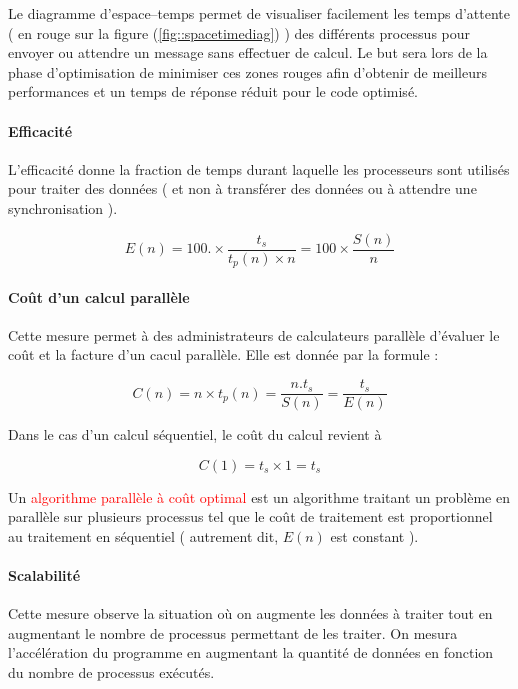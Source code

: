 \documentclass[fleqn,11pt]{article}
\begin{document}
Le diagramme d'espace--temps permet de visualiser facilement les temps d'attente ( en rouge sur la figure (\ref{fig::spacetimediag}) )
des différents processus pour envoyer ou attendre un message sans effectuer de calcul. Le but sera lors de la phase d'optimisation
de minimiser ces zones rouges afin d'obtenir de meilleurs performances et un temps de réponse réduit pour le code optimisé.



\paragraph{Efficacité}

L'efficacité donne la fraction de temps durant laquelle les processeurs sont utilisés pour traiter des données ( et non
à transférer des données ou à attendre une synchronisation ).

\begin{equation}
 E(n) = 100.\times \frac{t_{s}}{t_{p}(n)\times n} = 100\times\frac{S(n)}{n}
\end{equation}

\paragraph{Coût d'un calcul parallèle}

Cette mesure permet à des administrateurs de calculateurs parallèle d'évaluer le coût et la facture d'un cacul parallèle.
Elle est donnée par la formule :

\begin{equation}
 C(n) = n \times t_{p}(n) = \frac{n.t_{s}}{S(n)} = \frac{t_{s}}{E(n)}
\end{equation}

Dans le cas d'un calcul séquentiel, le coût du calcul revient à

\[
 C(1) = t_{s} \times 1 = t_{s}
\]

Un \textcolor{red}{algorithme parallèle à coût optimal} est un algorithme traitant un problème en parallèle sur plusieurs
processus tel que le coût de traitement est proportionnel au traitement en séquentiel ( autrement dit, $E(n)$ est constant ).

\paragraph{Scalabilité}

Cette mesure observe la situation où on augmente les données à traiter tout en augmentant le nombre de processus permettant de les traiter.
On mesura l'accélération du programme en augmentant la quantité de données en fonction du nombre de processus exécutés.
\end{document}
